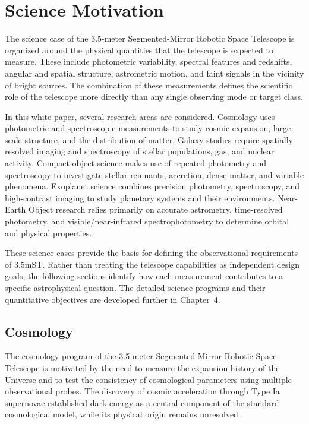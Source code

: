 \chapter{Science Motivation}

The science case of the 3.5-meter Segmented-Mirror Robotic Space Telescope
is organized around the physical quantities that the telescope is expected
to measure. These include photometric variability, spectral features and
redshifts, angular and spatial structure, astrometric motion, and faint
signals in the vicinity of bright sources. The combination of these
measurements defines the scientific role of the telescope more directly
than any single observing mode or target class.

In this white paper, several research areas are considered. Cosmology uses
photometric and spectroscopic measurements to study cosmic expansion,
large-scale structure, and the distribution of matter. Galaxy studies
require spatially resolved imaging and spectroscopy of stellar populations,
gas, and nuclear activity. Compact-object science makes use of repeated
photometry and spectroscopy to investigate stellar remnants, accretion,
dense matter, and variable phenomena. Exoplanet science combines precision
photometry, spectroscopy, and high-contrast imaging to study planetary
systems and their environments. Near-Earth Object research relies primarily
on accurate astrometry, time-resolved photometry, and visible/near-infrared
spectrophotometry to determine orbital and physical properties.

These science cases provide the basis for defining the observational
requirements of 3.5mST. Rather than treating the telescope capabilities as
independent design goals, the following sections identify how each
measurement contributes to a specific astrophysical question. The detailed
science programs and their quantitative objectives are developed further in
Chapter~4.

\section{Cosmology}

The cosmology program of the 3.5-meter Segmented-Mirror Robotic Space
Telescope is motivated by the need to measure the expansion history of the
Universe and to test the consistency of cosmological parameters using
multiple observational probes. The discovery of cosmic acceleration through
Type Ia supernovae established dark energy as a central component of the
standard cosmological model, while its physical origin remains unresolved
\cite{riess98,perlmutter99,planck2020}.

